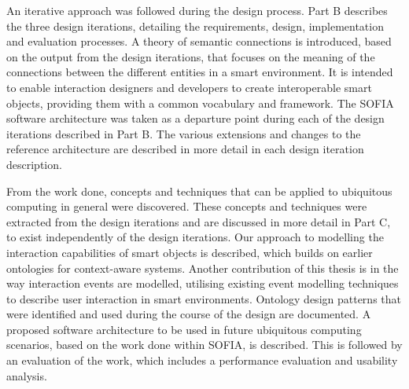 An iterative approach was followed during the design process. Part B describes the three design iterations, detailing the requirements, design, implementation and evaluation processes. A theory of semantic connections is introduced, based on the output from the design iterations, that focuses on the meaning of the connections between the different entities in a smart environment. It is intended to enable interaction designers and developers to create interoperable smart objects, providing them with a common vocabulary and framework. The \ac{SOFIA} software architecture was taken as a departure point during each of the design iterations described in Part B. The various extensions and changes to the reference architecture are described in more detail in each design iteration description. 

From the work done, concepts and techniques that can be applied to ubiquitous computing in general were discovered. These concepts and techniques were extracted from the design iterations and are discussed in more detail in Part C, to exist independently of the design iterations. Our approach to modelling the interaction capabilities of smart objects is described, which builds on earlier ontologies for context-aware systems. Another contribution of this thesis is in the way interaction events are modelled, utilising existing event modelling techniques to describe user interaction in smart environments. Ontology design patterns that were identified and used during the course of the design are documented. A proposed software architecture to be used in future ubiquitous computing scenarios, based on the work done within \ac{SOFIA}, is described. This is followed by an evaluation of the work, which includes a performance evaluation and usability analysis. 






